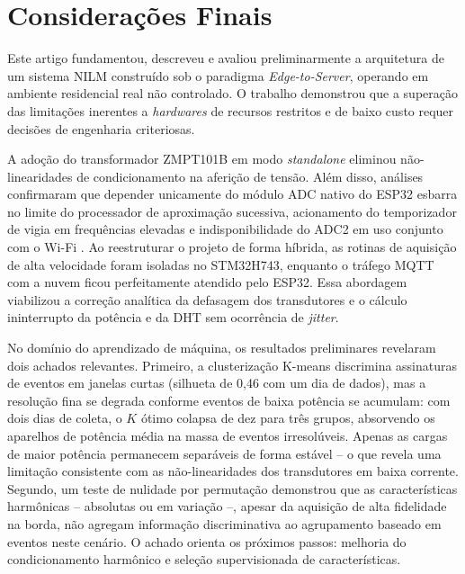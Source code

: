 \documentclass[12pt]{article}
\begin{document}
\section{Considera\c{c}\~oes Finais}

Este artigo fundamentou, descreveu e avaliou preliminarmente a arquitetura de
um sistema NILM constru\'ido sob o paradigma \textit{Edge-to-Server}, operando
em ambiente residencial real n\~ao controlado. O trabalho demonstrou que a
supera\c{c}\~ao das limita\c{c}\~oes inerentes a \textit{hardwares} de recursos
restritos e de baixo custo requer decis\~oes de engenharia criteriosas.

A ado\c{c}\~ao do transformador ZMPT101B em modo \textit{standalone} eliminou
n\~ao-linearidades de condicionamento na aferi\c{c}\~ao de tens\~ao. Al\'em disso,
an\'alises confirmaram que depender unicamente do m\'odulo ADC nativo do ESP32
esbarra no limite do processador de aproxima\c{c}\~ao sucessiva, acionamento do
temporizador de vigia em frequ\^encias elevadas e indisponibilidade do ADC2 em uso
conjunto com o Wi-Fi \cite{ref8}. Ao reestruturar o projeto de forma h\'ibrida, as
rotinas de aquisi\c{c}\~ao de alta velocidade foram isoladas no STM32H743,
enquanto o tr\'afego MQTT com a nuvem ficou perfeitamente atendido pelo ESP32.
Essa abordagem viabilizou a corre\c{c}\~ao anal\'itica da defasagem dos
transdutores e o c\'alculo ininterrupto da pot\^encia e da DHT sem ocorr\^encia
de \textit{jitter}.

No dom\'inio do aprendizado de m\'aquina, os resultados preliminares revelaram dois
achados relevantes. Primeiro, a clusteriza\c{c}\~ao K-means discrimina assinaturas
de eventos em janelas curtas (silhueta de 0{,}46 com um dia de dados), mas a
resolu\c{c}\~ao fina se degrada conforme eventos de baixa pot\^encia se acumulam:
com dois dias de coleta, o $K$ \'otimo colapsa de dez para tr\^es grupos, absorvendo
os aparelhos de pot\^encia m\'edia na massa de eventos irresol\'uveis. Apenas as
cargas de maior pot\^encia permanecem separ\'aveis de forma est\'avel -- o que
revela uma limita\c{c}\~ao consistente com as n\~ao-linearidades dos transdutores
em baixa corrente. Segundo, um teste de nulidade por permuta\c{c}\~ao demonstrou
que as caracter\'isticas harm\^onicas -- absolutas ou em varia\c{c}\~ao --,
apesar da aquisi\c{c}\~ao de alta fidelidade na borda, n\~ao agregam informa\c{c}\~ao
discriminativa ao agrupamento baseado em eventos neste cen\'ario. O achado
orienta os pr\'oximos passos: melhoria do condicionamento harm\^onico e
sele\c{c}\~ao supervisionada de caracter\'isticas.
\end{document}
